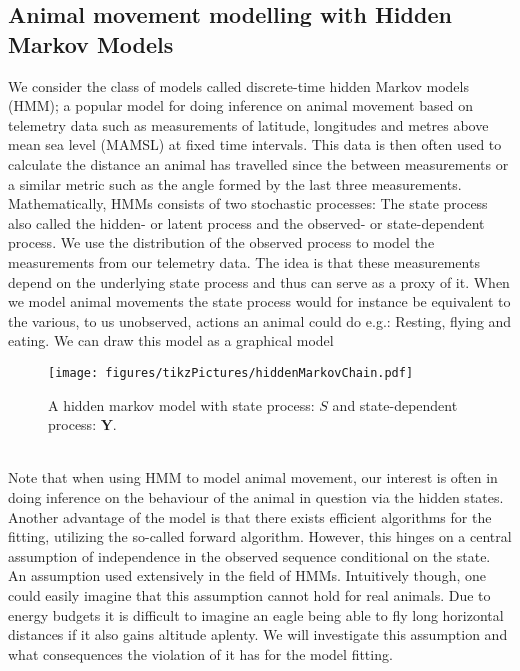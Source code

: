 
\subsection*{Animal movement modelling with Hidden Markov Models}
We consider the class of models called discrete-time hidden Markov models (HMM); a popular model for doing inference on animal movement based on telemetry data such as measurements of latitude, longitudes and metres above mean sea level (MAMSL) at fixed time intervals. This data is then often used to calculate the distance an animal has travelled since the between measurements or a similar metric such as the angle formed by the last three measurements.\\ Mathematically, HMMs consists of two stochastic processes: The state process also called the hidden- or latent process and the observed- or state-dependent process. 
We use the distribution of the observed process to model the measurements from our telemetry data. The idea is that these measurements depend on the underlying state process and thus can serve as a proxy of it. When we model animal movements the state process would for instance be equivalent to the various, to us unobserved, actions an animal could do e.g.: Resting, flying and eating. We can draw this model as a graphical model
\begin{figure}[h]
    \centering
    \texttt{[image: figures/tikzPictures/hiddenMarkovChain.pdf]}
    \caption{A hidden markov model with state process: $S$ and state-dependent process: $\mathbf{Y}$.}
\end{figure}\\
Note that when using HMM to model animal movement, our interest is often in doing inference on the behaviour of the animal in question via the hidden states. Another advantage of the model is that there exists efficient algorithms for the fitting, utilizing the so-called forward algorithm. However, this hinges on a central assumption of independence in the observed sequence conditional on the state. An assumption used extensively in the field of HMMs. Intuitively though, one could easily imagine that this assumption cannot hold for real animals. Due to energy budgets it is difficult to imagine an eagle being able to fly long horizontal distances if it also gains altitude aplenty. We will investigate this assumption and what consequences the violation of it has for the model fitting.
